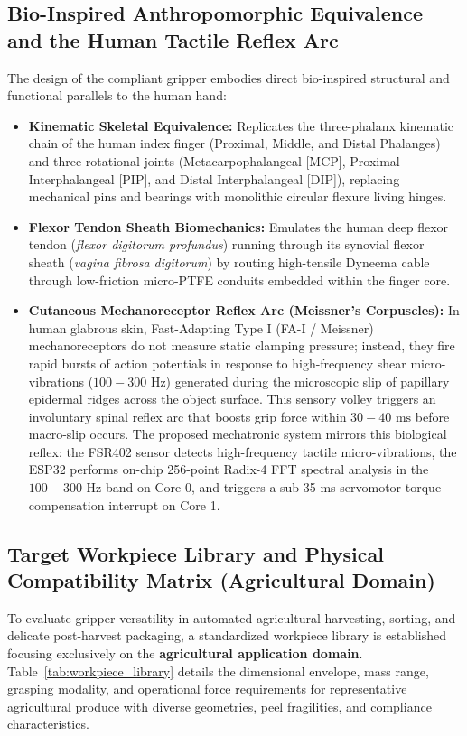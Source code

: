 \documentclass[12pt,a4paper]{report}
\begin{document}
\subsection{Bio-Inspired Anthropomorphic Equivalence and the Human Tactile Reflex Arc}
The design of the compliant gripper embodies direct bio-inspired structural and functional parallels to the human hand:
\begin{itemize}
    \item \textbf{Kinematic Skeletal Equivalence:} Replicates the three-phalanx kinematic chain of the human index finger (Proximal, Middle, and Distal Phalanges) and three rotational joints (Metacarpophalangeal [MCP], Proximal Interphalangeal [PIP], and Distal Interphalangeal [DIP]), replacing mechanical pins and bearings with monolithic circular flexure living hinges.
    \item \textbf{Flexor Tendon Sheath Biomechanics:} Emulates the human deep flexor tendon (\textit{flexor digitorum profundus}) running through its synovial flexor sheath (\textit{vagina fibrosa digitorum}) by routing high-tensile Dyneema cable through low-friction micro-PTFE conduits embedded within the finger core.
    \item \textbf{Cutaneous Mechanoreceptor Reflex Arc (Meissner's Corpuscles):} In human glabrous skin, Fast-Adapting Type I (FA-I / Meissner) mechanoreceptors do not measure static clamping pressure; instead, they fire rapid bursts of action potentials in response to high-frequency shear micro-vibrations ($100 - 300\text{ Hz}$) generated during the microscopic slip of papillary epidermal ridges across the object surface. This sensory volley triggers an involuntary spinal reflex arc that boosts grip force within $30 - 40\text{ ms}$ before macro-slip occurs. The proposed mechatronic system mirrors this biological reflex: the FSR402 sensor detects high-frequency tactile micro-vibrations, the ESP32 performs on-chip 256-point Radix-4 FFT spectral analysis in the $100 - 300\text{ Hz}$ band on Core 0, and triggers a sub-35 ms servomotor torque compensation interrupt on Core 1.
\end{itemize}

\subsection{Target Workpiece Library and Physical Compatibility Matrix (Agricultural Domain)}
To evaluate gripper versatility in automated agricultural harvesting, sorting, and delicate post-harvest packaging, a standardized workpiece library is established focusing exclusively on the \textbf{agricultural application domain}. Table~\ref{tab:workpiece_library} details the dimensional envelope, mass range, grasping modality, and operational force requirements for representative agricultural produce with diverse geometries, peel fragilities, and compliance characteristics.
\end{document}
